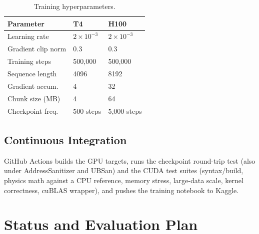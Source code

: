 \documentclass[11pt,a4paper]{article}
\begin{document}
\begin{table}[htbp]
\centering
\caption{Training hyperparameters.}
\label{tab:hyper}
\begin{tabular}{lll}
\toprule
\textbf{Parameter} & \textbf{T4} & \textbf{H100}\\
\midrule
Learning rate      & $2\times10^{-3}$ & $2\times10^{-3}$\\
Gradient clip norm & 0.3              & 0.3\\
Training steps     & 500{,}000        & 500{,}000\\
Sequence length    & 4096             & 8192\\
Gradient accum.    & 4                & 32\\
Chunk size (MB)    & 4                & 64\\
Checkpoint freq.   & 500 steps        & 5{,}000 steps\\
\bottomrule
\end{tabular}
\end{table}

\subsection{Continuous Integration}
GitHub Actions builds the GPU targets, runs the checkpoint round-trip
test (also under AddressSanitizer and UBSan) and the CUDA test suites
(syntax/build, physics math against a CPU reference, memory stress,
large-data scale, kernel correctness, cuBLAS wrapper), and pushes the
training notebook to Kaggle.

\section{Status and Evaluation Plan}
\label{sec:status}
\end{document}

